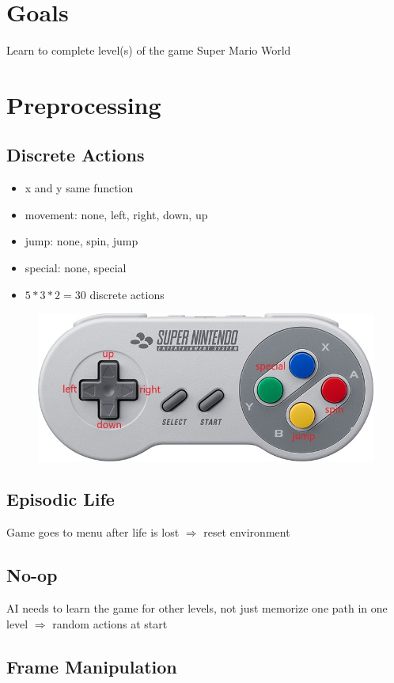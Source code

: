 \documentclass{article}
\begin{document}
    \section{Goals}
    Learn to complete level(s) of the game Super Mario World

    \section{Preprocessing}
    \subsection{Discrete Actions}
    \begin{itemize}
        \item x and y same function
        \item movement: none, left, right, down, up
        \item jump: none, spin, jump
        \item special: none, special
        \item $5*3*2=30$ discrete actions
    \end{itemize}
    \begin{figure}[H]
        \centering
        \includegraphics[width=.85\textwidth]{snes-controller-annot}
    \end{figure}
    \subsection{Episodic Life}
    Game goes to menu after life is lost $\Rightarrow$ reset environment
    \subsection{No-op}
    AI needs to learn the game for other levels, not just memorize one path in one level $\Rightarrow$ random actions at start
    \subsection{Frame Manipulation}
\end{document}
